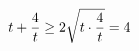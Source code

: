\documentclass[preview]{standalone}
\begin{document}
\begin{align*}
\special{dvisvgm:raw <g id='unique000'>}t+\frac{4}{t}\ge 2\sqrt{t\cdot\frac{4}{t}}=4\special{dvisvgm:raw </g>}
\end{align*}
\end{document}
